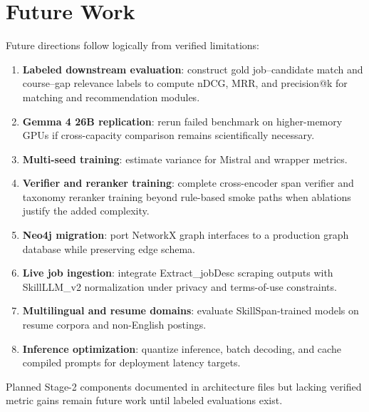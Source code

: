 \chapter{Future Work}
\label{ch:future}

Future directions follow logically from verified limitations:

\begin{enumerate}
  \item \textbf{Labeled downstream evaluation}: construct gold job--candidate match and course--gap relevance labels to compute nDCG, MRR, and precision@k for matching and recommendation modules.
  \item \textbf{Gemma 4 26B replication}: rerun failed benchmark on higher-memory GPUs if cross-capacity comparison remains scientifically necessary.
  \item \textbf{Multi-seed training}: estimate variance for Mistral and wrapper metrics.
  \item \textbf{Verifier and reranker training}: complete cross-encoder span verifier and taxonomy reranker training beyond rule-based smoke paths when ablations justify the added complexity.
  \item \textbf{Neo4j migration}: port NetworkX graph interfaces to a production graph database while preserving edge schema.
  \item \textbf{Live job ingestion}: integrate Extract\_jobDesc scraping outputs with SkillLLM\_v2 normalization under privacy and terms-of-use constraints.
  \item \textbf{Multilingual and resume domains}: evaluate SkillSpan-trained models on resume corpora and non-English postings.
  \item \textbf{Inference optimization}: quantize inference, batch decoding, and cache compiled prompts for deployment latency targets.
\end{enumerate}

Planned Stage-2 components documented in architecture files but lacking verified metric gains remain future work until labeled evaluations exist.
